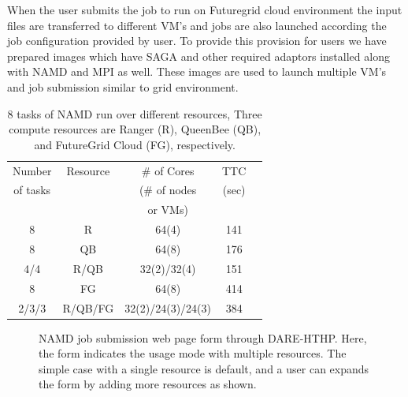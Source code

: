\documentclass{sig-alternate}
\begin{document}
When the user submits the job to run on Futuregrid cloud environment the input files are transferred to different VM's 
 and jobs are also launched according the job configuration provided by user. To provide this provision for users we have prepared images which have SAGA and 
other required adaptors installed along with NAMD and MPI as well.  These images are used to launch multiple VM's and job submission similar to grid environment.

 \begin{table}
\small
 \begin{tabular}{|c|c|c|c|c|} 
 \hline 
 Number           & Resource    & \# of Cores             &	TTC  \\
of tasks                &     & (\# of nodes           & (sec) \\  
  &   & or VMs) & \\   \hline
8& R&	64(4)	&141\\
\hline                  
8& QB	&	64(8)	&176 \\
\hline
4/4&R/QB	&	32(2)/32(4) &151\\
\hline
8&FG	&	64(8) &414 \\
\hline
2/3/3&R/QB/FG	&32(2)/24(3)/24(3)	 &384\\
\hline


\end{tabular}
\caption{8 tasks of NAMD run over different resources, Three compute resources are Ranger (R), QueenBee (QB), and FutureGrid Cloud (FG), respectively.}

  \label{table:HTHP-Distributed} 
\end{table}


\begin{figure}
 \centering
\caption{\small NAMD job submission web page form through DARE-HTHP. Here, the form indicates the usage mode with multiple resources.  The simple case with a single resource is default, and a user can expands the form by adding more resources as shown.}
  \label{fig:NAMD2}
\end{figure}
\end{document}
